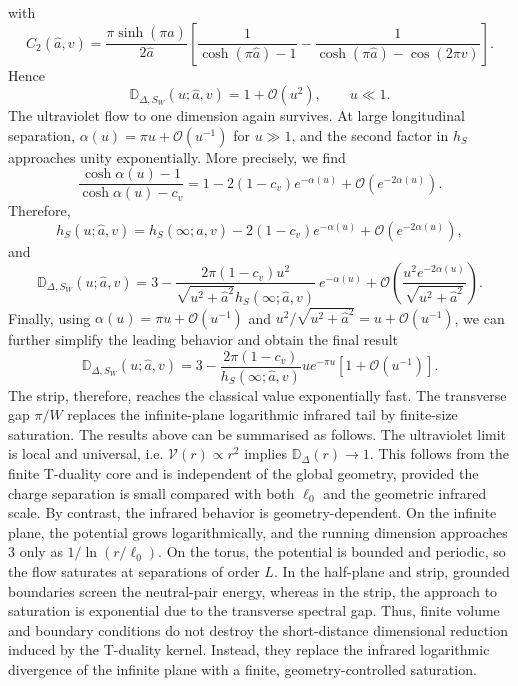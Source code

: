 \documentclass[openacc]{rsproca_new}%
\begin{document}
with
\begin{equation}
C_2(\widehat{a},v)=\frac{\pi\sinh(\pi\widehat{a})}{2\widehat{a}}\left[
\frac{1}{\cosh(\pi \widehat{a})-1}-\frac{1}{\cosh(\pi\widehat{a})-\cos(2\pi v)}\right].
\end{equation}
Hence
\begin{equation}
\mathbb D_{\Delta,S_W}(u;\widehat{a},v)=1+\mathcal{O}(u^2),\qquad u\ll 1.
\end{equation}
The ultraviolet flow to one dimension again survives. At large longitudinal separation, $\alpha(u)=\pi u+\mathcal{O}(u^{-1})$ for $u\gg 1$, and the second factor in $h_S$ approaches unity exponentially. More precisely, we find
\begin{equation}
\frac{\cosh\alpha(u)-1}{\cosh\alpha(u)-c_v}=1-2(1-c_v)e^{-\alpha(u)}+\mathcal{O}(e^{-2\alpha(u)}).
\end{equation}
Therefore, 
\begin{equation}
h_S(u;\widehat{a},v)=h_S(\infty;\widehat{a},v)-2(1-c_v)e^{-\alpha(u)}+\mathcal{O}(e^{-2\alpha(u)}),
\end{equation}
and
\begin{equation}
\mathbb D_{\Delta,S_W}(u;\widehat{a},v)=3-\frac{2\pi(1-c_v)u^2}{\sqrt{u^2+\widehat{a}^2}h_S(\infty;\widehat{a},v)}~e^{-\alpha(u)}+\mathcal{O}\left(\frac{u^2 e^{-2\alpha(u)}}{\sqrt{u^2+\widehat{a}^2}}\right).
\end{equation}
Finally, using $\alpha(u)=\pi u+\mathcal{O}(u^{-1})$ and $u^2/\sqrt{u^2+\widehat{a}^2}=u+\mathcal{O}(u^{-1})$, we can further simplify the leading behavior and obtain the final result
\begin{equation}
\mathbb D_{\Delta,S_W}(u;\widehat{a},v)=3-\frac{2\pi(1-c_v)}{h_S(\infty;\widehat{a},v)}ue^{-\pi u}\left[1+\mathcal{O}(u^{-1})\right].
\end{equation}
The strip, therefore, reaches the classical value exponentially fast. The transverse gap $\pi/W$ replaces the infinite-plane logarithmic infrared tail by finite-size saturation. The results above can be summarised as follows. The ultraviolet limit is local and universal, i.e. $\mathcal V(r)\propto r^2$ implies $\mathbb D_\Delta(r)\to 1$. This follows from the finite T-duality core and is independent of the global geometry, provided the charge separation is small compared with both $\ell_0$ and the geometric infrared scale. By contrast, the infrared behavior is geometry-dependent. On the infinite plane, the potential grows logarithmically, and the running dimension approaches $3$ only as $1/\ln(r/\ell_0)$. On the torus, the potential is bounded and periodic, so the flow saturates at separations of order $L$. In the half-plane and strip, grounded boundaries screen the neutral-pair energy, whereas in the strip, the approach to saturation is exponential due to the transverse spectral gap. Thus, finite volume and boundary conditions do not destroy the short-distance dimensional reduction induced by the T-duality kernel. Instead, they replace the infrared logarithmic divergence of the infinite plane with a finite, geometry-controlled saturation.
\end{document}
